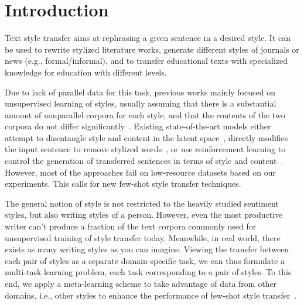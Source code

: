 \section{Introduction}
\label{sec:intro}

Text style transfer aims at rephrasing a given sentence in a desired style. It can be used to rewrite stylized literature works, generate different styles of journals or news (e.g., formal/informal), and to transfer educational texts with specialized knowledge for education with different levels.

Due to lack of parallel data for this task, previous works mainly focused on unsupervised learning of styles, usually assuming that there is a substantial amount of nonparallel corpora for each style, and that the contents of the two corpora do not differ significantly~\cite{shen2017style,john2018disentangled,fu2018style}. Existing state-of-the-art models either attempt to disentangle style and content in the latent space~\cite{shen2017style,john2018disentangled,fu2018style}, directly modifies the input sentence to remove stylized words~\cite{li2018delete}, or use reinforcement learning to control the generation of transferred sentences in terms of style and content~\cite{wu2019hierarchical,luo2019dual}. However, most of the approaches fail on low-resource datasets based on our experiments. This calls for new few-shot style transfer techniques. 


The general notion of style is not restricted to the heavily studied sentiment styles, but also writing styles of a person. However, even the most productive writer can't produce a fraction of the text corpora commonly used for unsupervised training of style transfer today.
Meanwhile, in real world, there exists as many writing styles as you can imagine. Viewing the transfer between each pair of styles as a separate domain-specific task, we can thus formulate a multi-task learning problem, each task corresponding to a pair of styles. To this end, we apply a meta-learning scheme to take advantage of data from other domains, i.e., other styles to enhance the performance of few-shot style transfer~\cite{finn2017model}.


